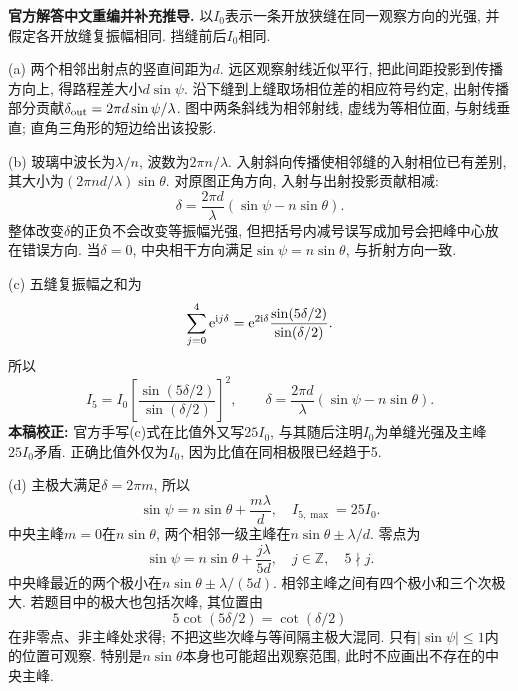 \begin{solution}
\textbf{官方解答中文重编并补充推导.}
以$I_0$表示一条开放狭缝在同一观察方向的光强, 并假定各开放缝复振幅相同. 挡缝前后$I_0$相同.

(a) 两个相邻出射点的竖直间距为$d$. 远区观察射线近似平行, 把此间距投影到传播方向上, 得路程差大小$d\sin\psi$. 沿下缝到上缝取场相位差的相应符号约定, 出射传播部分贡献$\delta_{\rm out}=2\pi d\sin\psi/\lambda$. 图中两条斜线为相邻射线, 虚线为等相位面, 与射线垂直; 直角三角形的短边给出该投影.
\begin{center}
\end{center}
(b) 玻璃中波长为$\lambda/n$, 波数为$2\pi n/\lambda$. 入射斜向传播使相邻缝的入射相位已有差别, 其大小为$(2\pi nd/\lambda)\sin\theta$. 对原图正角方向, 入射与出射投影贡献相减:
\[
\delta=\frac{2\pi d}{\lambda}(\sin\psi-n\sin\theta).
\]
整体改变$\delta$的正负不会改变等振幅光强, 但把括号内减号误写成加号会把峰中心放在错误方向. 当$\delta=0$, 中央相干方向满足$\sin\psi=n\sin\theta$, 与折射方向一致.

(c) 五缝复振幅之和为
\[
\sum_{j=0}^4\mathrm e^{\mathrm i j\delta}
=\mathrm e^{2\mathrm i\delta}\frac{\sin(5\delta/2)}{\sin(\delta/2)}.
\]
所以
\[
I_5=I_0\left[\frac{\sin(5\delta/2)}{\sin(\delta/2)}\right]^2,
\qquad \delta=\frac{2\pi d}{\lambda}(\sin\psi-n\sin\theta).
\]
\textbf{本稿校正:} 官方手写(c)式在比值外又写$25I_0$, 与其随后注明$I_0$为单缝光强及主峰$25I_0$矛盾. 正确比值外仅为$I_0$, 因为比值在同相极限已经趋于5.

(d) 主极大满足$\delta=2\pi m$, 所以
\[
\sin\psi=n\sin\theta+\frac{m\lambda}{d},\quad I_{5,\max}=25I_0.
\]
中央主峰$m=0$在$n\sin\theta$, 两个相邻一级主峰在$n\sin\theta\pm\lambda/d$. 零点为
\[
\sin\psi=n\sin\theta+\frac{j\lambda}{5d},\quad j\in\mathbb Z,\quad5\nmid j.
\]
中央峰最近的两个极小在$n\sin\theta\pm\lambda/(5d)$. 相邻主峰之间有四个极小和三个次极大. 若题目中的极大也包括次峰, 其位置由
\[
5\cot(5\delta/2)=\cot(\delta/2)
\]
在非零点、非主峰处求得; 不把这些次峰与等间隔主极大混同. 只有$|\sin\psi|\le1$内的位置可观察. 特别是$n\sin\theta$本身也可能超出观察范围, 此时不应画出不存在的中央主峰.


\end{solution}
